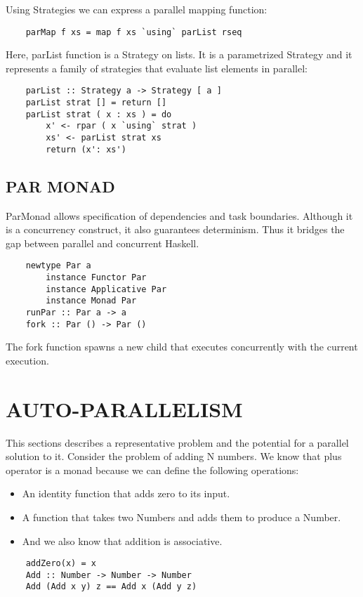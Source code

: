 \documentclass[12pt,a4paper]{article}
\begin{document}
Using Strategies we can express a parallel mapping function:
	\lstset{}
	\begin{lstlisting}
	parMap f xs = map f xs `using` parList rseq
	\end{lstlisting}

Here, parList function is a Strategy on lists. It is a parametrized Strategy and it represents a family of strategies that evaluate list elements in parallel:
	\lstset{}
	\begin{lstlisting}
	parList :: Strategy a -> Strategy [ a ] 
	parList strat [] = return [] 
	parList strat ( x : xs ) = do 
	  	x' <- rpar ( x `using` strat ) 
  		xs' <- parList strat xs 
	  	return (x': xs')	
	\end{lstlisting}
	
	\subsection{PAR MONAD} \label{par_monad}
	ParMonad allows specification of dependencies and task boundaries. Although it is a concurrency construct, it also guarantees determinism. Thus it bridges the gap between parallel and concurrent Haskell.
	\lstset{}
	\begin{lstlisting}
	newtype Par a 
	  	instance Functor Par 
  		instance Applicative Par 
  		instance Monad Par 
	runPar :: Par a -> a
	fork :: Par () -> Par ()
	\end{lstlisting}

	The fork function spawns a new child that executes concurrently with the current execution.

	\section{\large AUTO-PARALLELISM} \label{autopar}
    \indent \par This sections describes a representative problem and the potential for a parallel solution to it. Consider the problem of adding N numbers. We know that plus operator is a monad because we can define the following operations:
    \begin{itemize}
    \item An identity function that adds zero to its input.
	\item A function that takes two Numbers and adds them to produce a Number.
	\item And we also know that addition is associative.
    \end{itemize}
	\lstset{}
	\begin{lstlisting}
	addZero(x) = x
	Add :: Number -> Number -> Number
	Add (Add x y) z == Add x (Add y z)
	\end{lstlisting}
\end{document}
